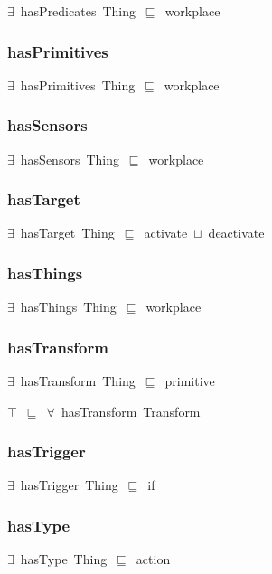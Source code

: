 \documentclass{article}
\begin{document}
\ensuremath{\exists}~hasPredicates~Thing~\ensuremath{\sqsubseteq}~workplace

\subsubsection*{hasPrimitives}

\ensuremath{\exists}~hasPrimitives~Thing~\ensuremath{\sqsubseteq}~workplace

\subsubsection*{hasSensors}

\ensuremath{\exists}~hasSensors~Thing~\ensuremath{\sqsubseteq}~workplace

\subsubsection*{hasTarget}

\ensuremath{\exists}~hasTarget~Thing~\ensuremath{\sqsubseteq}~activate~\ensuremath{\sqcup}~deactivate

\subsubsection*{hasThings}

\ensuremath{\exists}~hasThings~Thing~\ensuremath{\sqsubseteq}~workplace

\subsubsection*{hasTransform}

\ensuremath{\exists}~hasTransform~Thing~\ensuremath{\sqsubseteq}~primitive

\ensuremath{\top}~\ensuremath{\sqsubseteq}~\ensuremath{\forall}~hasTransform~Transform

\subsubsection*{hasTrigger}

\ensuremath{\exists}~hasTrigger~Thing~\ensuremath{\sqsubseteq}~if

\subsubsection*{hasType}

\ensuremath{\exists}~hasType~Thing~\ensuremath{\sqsubseteq}~action
\end{document}
